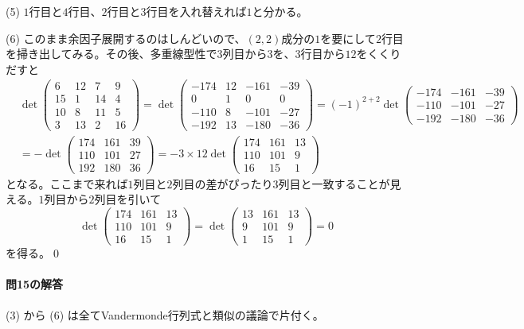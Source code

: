 \noindent (5) $1$行目と$4$行目、$2$行目と$3$行目を入れ替えれば$1$と分かる。

\noindent (6) このまま余因子展開するのはしんどいので、$(2, 2)$成分の$1$を要にして$2$行目を掃き出してみる。その後、多重線型性で$3$列目から$3$を、$3$行目から$12$をくくりだすと
\begin{align*}
&\det
\begin{pmatrix}
6 & 12 & 7 & 9 \\
15 & 1 & 14 & 4 \\
10 & 8 & 11 & 5 \\
3 & 13 & 2 & 16
\end{pmatrix}
=
\det
\begin{pmatrix}
-174 & 12 & -161 & -39 \\
0 & 1 & 0 & 0 \\
-110 & 8 & -101 & -27 \\
-192 & 13 & -180 & -36
\end{pmatrix}
= (-1)^{2 + 2}
\det
\begin{pmatrix}
-174 & -161 & -39 \\
-110 & -101 & -27 \\
-192 & -180 & -36
\end{pmatrix} \\
&= - \det
\begin{pmatrix}
174 & 161 & 39 \\
110 & 101 & 27 \\
192 & 180 & 36
\end{pmatrix}
= -3 \times 12
\det
\begin{pmatrix}
174 & 161 & 13 \\
110 & 101 & 9 \\
16 & 15 & 1
\end{pmatrix}
\end{align*}
となる。ここまで来れば$1$列目と$2$列目の差がぴったり$3$列目と一致することが見える。$1$列目から$2$列目を引いて
\[
\det
\begin{pmatrix}
174 & 161 & 13 \\
110 & 101 & 9 \\
16 & 15 & 1
\end{pmatrix}
=
\det
\begin{pmatrix}
13 & 161 & 13 \\
9 & 101 & 9 \\
1 & 15 & 1
\end{pmatrix}
=0
\]
を得る。\qed

\paragraph{問15の解答} (3) から (6) は全てVandermonde行列式と類似の議論で片付く。

